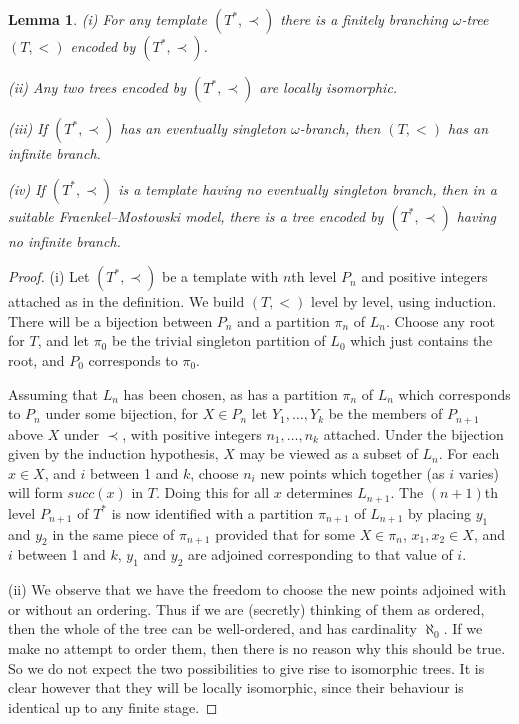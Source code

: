 \documentclass[10pt,a4paper]{amsart}
\newtheorem{lemma}[theorem]{Lemma}
\begin{document}
\begin{lemma} (i) For any template $(T^*, \prec)$ there is a finitely branching $\omega$-tree $(T, <)$ encoded by $(T^*, \prec)$.

(ii) Any two trees encoded by $(T^*, \prec)$ are locally isomorphic.

(iii) If $(T^*, \prec)$ has an eventually singleton $\omega$-branch, then $(T, <)$ has an infinite branch.

(iv) If $(T^*, \prec)$ is a template having no eventually singleton branch, then in a suitable Fraenkel--Mostowski model, 
there is a tree encoded by $(T^*, \prec)$ having no infinite branch. \label{4.3}  \end{lemma}

\begin{proof} (i) Let $(T^*, \prec)$ be a template with $n$th level $P_n$ and positive integers attached as in the
definition. We build $(T,<)$ level by level, using induction. There will be a bijection between $P_n$ and a partition $\pi_n$ of
$L_n$. Choose any root for $T$, and let $\pi_0$ be the trivial singleton partition of $L_0$ which just contains the root, and
$P_0$ corresponds to $\pi_0$.

Assuming that $L_n$ has been chosen, as has a partition $\pi_n$ of $L_n$ which corresponds to $P_n$ under some bijection, for
$X \in P_n$ let $Y_1, \ldots, Y_k$ be the members of $P_{n+1}$ above $X$ under $\prec$, with positive integers $n_1, \ldots, n_k$
attached. Under the bijection given by the induction hypothesis, $X$ may be viewed as a subset of $L_n$. For each $x \in X$, and
$i$ between 1 and $k$, choose $n_i$ new points which together (as $i$ varies) will form $succ(x)$ in $T$. Doing this for all
$x$ determines $L_{n+1}$. The $(n+1)$th level $P_{n+1}$ of $T^*$ is now identified with a partition $\pi_{n+1}$ of $L_{n+1}$ by placing
$y_1$ and $y_2$ in the same piece of $\pi_{n+1}$ provided that for some $X \in \pi_n$, $x_1, x_2 \in X$, and $i$ between 1 and $k$,
$y_1$ and $y_2$ are adjoined corresponding to that value of $i$.

(ii) We observe that we have the freedom to choose the new points adjoined with or without an ordering. Thus if we are (secretly) 
thinking of them as ordered, then the whole of the tree can be well-ordered, and has cardinality $\aleph_0$. If we make no attempt
to order them, then there is no reason why this should be true. So we do not expect the two possibilities to give rise to 
isomorphic trees. It is clear however that they will be locally isomorphic, since their behaviour is identical up to any finite
stage.


\end{proof}
\end{document}
